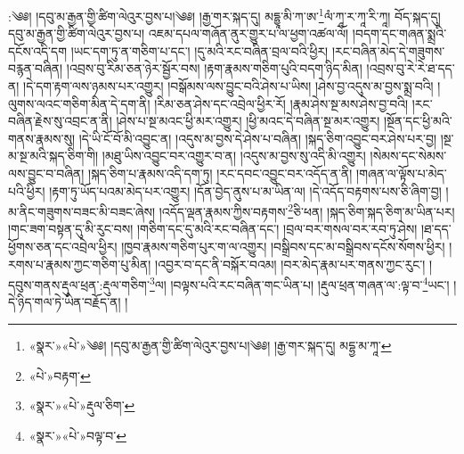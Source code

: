 :༄༅། །དབུ་མ་རྒྱན་གྱི་ཚིག་ལེའུར་བྱས་པ།༄༅། །རྒྱ་གར་སྐད་དུ། མདྷྱཱ་མི་ཀ་ཨ་\footnote{«སྣར་»«པེ་»༄༅། །དབུ་མ་རྒྱན་གྱི་ཚིག་ལེའུར་བྱས་པ།༄༅། །རྒྱ་གར་སྐད་དུ། མདྷྱ་མ་ཀཱ་}ལཾ་ཀཱ་ར་ཀཱ་རི་ཀཱ། བོད་སྐད་དུ། དབུ་མ་རྒྱན་གྱི་ཚིག་ལེའུར་བྱས་པ། འཇམ་དཔལ་གཞོན་ནུར་གྱུར་པ་ལ་ཕྱག་འཚལ་ལོ། །བདག་དང་གཞན་སྨྲའི་དངོས་འདི་དག །ཡང་དག་ཏུ་ན་གཅིག་པ་དང་། །དུ་མའི་རང་བཞིན་བྲལ་བའི་ཕྱིར། །རང་བཞིན་མེད་དེ་གཟུགས་བརྙན་བཞིན། །འབྲས་བུ་རིམ་ཅན་ཉེར་སྦྱོར་བས། །རྟག་རྣམས་གཅིག་པུའི་བདག་ཉིད་མིན། །འབྲས་བུ་རེ་རེ་ཐ་དད་ན། །དེ་དག་རྟག་ལས་ཉམས་པར་འགྱུར། །བསྒོམས་ལས་བྱུང་བའི་ཤེས་པ་ཡིས། །ཤེས་བྱ་འདུས་མ་བྱས་སྨྲ་བའི། །ལུགས་ལའང་གཅིག་མིན་དེ་དག་ནི། །རིམ་ཅན་ཤེས་དང་འབྲེལ་ཕྱིར་རོ། །རྣམ་ཤེས་སྔ་མས་ཤེས་བྱ་བའི། །རང་བཞིན་རྗེས་སུ་འབྲང་ན་ནི། །ཤེས་པ་སྔ་མའང་ཕྱི་མར་འགྱུར། །ཕྱི་མའང་དེ་བཞིན་སྔ་མར་འགྱུར། །སྔོན་དང་ཕྱི་མའི་གནས་རྣམས་སུ། །དེ་ཡི་ངོ་བོ་མི་འབྱུང་ན། །འདུས་མ་བྱས་དེ་ཤེས་པ་བཞིན། །སྐད་ཅིག་འབྱུང་བར་ཤེས་པར་བྱ། །སྔ་མ་སྔ་མའི་སྐད་ཅིག་གི། །མཐུ་ཡིས་འབྱུང་བར་འགྱུར་བ་ན། །འདུས་མ་བྱས་སུ་འདི་མི་འགྱུར། །སེམས་དང་སེམས་ལས་བྱུང་བ་བཞིན། །སྐད་ཅིག་པ་རྣམས་འདི་དག་ཏུ། །རང་དབང་འབྱུང་བར་འདོད་ན་ནི། །གཞན་ལ་ལྟོས་པ་མེད་པའི་ཕྱིར། །རྟག་ཏུ་ཡོད་པའམ་མེད་པར་འགྱུར། །དོན་བྱེད་ནུས་པ་མ་ཡིན་ལ། །དེ་འདོད་བརྟགས་པས་ཅི་ཞིག་བྱ། །མ་ནིང་གཟུགས་བཟང་མི་བཟང་ཞེས། །འདོད་ལྡན་རྣམས་ཀྱིས་བརྟགས་\footnote{«པེ་»བརྟག་}ཅི་ཕན། །སྐད་ཅིག་སྐད་ཅིག་མ་ཡིན་པར། །གང་ཟག་བསྟན་དུ་མི་རུང་བས། །གཅིག་དང་དུ་མའི་རང་བཞིན་དང་། །བྲལ་བར་གསལ་བར་རབ་ཏུ་ཤེས། །ཐ་དད་ཕྱོགས་ཅན་དང་འབྲེལ་ཕྱིར། །ཁྱབ་རྣམས་གཅིག་པུར་ག་ལ་འགྱུར། །བསྒྲིབས་དང་མ་བསྒྲིབས་དངོས་སོགས་ཕྱིར། །རགས་པ་རྣམས་ཀྱང་གཅིག་པུ་མིན། །འབྱར་བ་དང་ནི་བསྐོར་བའམ། །བར་མེད་རྣམ་པར་གནས་ཀྱང་རུང་། །དབུས་གནས་རྡུལ་ཕྲན་:རྡུལ་གཅིག་\footnote{«སྣར་»«པེ་»རྡུལ་ཅིག་}ལ། །བལྟས་པའི་རང་བཞིན་གང་ཡིན་པ། །རྡུལ་ཕྲན་གཞན་ལ་:ལྟ་བ་\footnote{«སྣར་»«པེ་»བལྟ་བ་}ཡང་། །དེ་ཉིད་གལ་ཏེ་ཡིན་བརྗོད་ན། །
